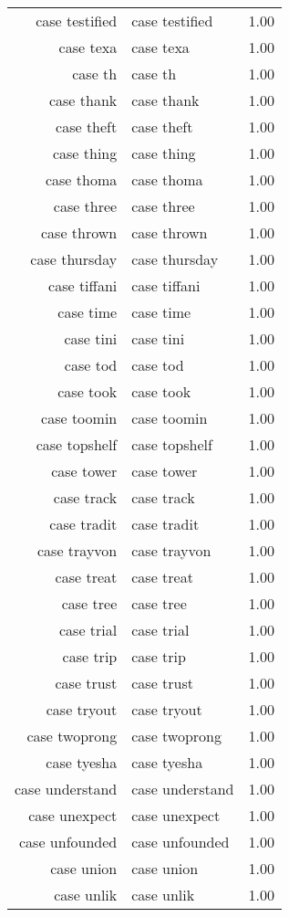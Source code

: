 \begin{table}[ht]
\begin{tabular}{rlr}
  case testified & case testified & 1.00 \\ 
  case texa & case texa & 1.00 \\ 
  case th & case th & 1.00 \\ 
  case thank & case thank & 1.00 \\ 
  case theft & case theft & 1.00 \\ 
  case thing & case thing & 1.00 \\ 
  case thoma & case thoma & 1.00 \\ 
  case three & case three & 1.00 \\ 
  case thrown & case thrown & 1.00 \\ 
  case thursday & case thursday & 1.00 \\ 
  case tiffani & case tiffani & 1.00 \\ 
  case time & case time & 1.00 \\ 
  case tini & case tini & 1.00 \\ 
  case tod & case tod & 1.00 \\ 
  case took & case took & 1.00 \\ 
  case toomin & case toomin & 1.00 \\ 
  case topshelf & case topshelf & 1.00 \\ 
  case tower & case tower & 1.00 \\ 
  case track & case track & 1.00 \\ 
  case tradit & case tradit & 1.00 \\ 
  case trayvon & case trayvon & 1.00 \\ 
  case treat & case treat & 1.00 \\ 
  case tree & case tree & 1.00 \\ 
  case trial & case trial & 1.00 \\ 
  case trip & case trip & 1.00 \\ 
  case trust & case trust & 1.00 \\ 
  case tryout & case tryout & 1.00 \\ 
  case twoprong & case twoprong & 1.00 \\ 
  case tyesha & case tyesha & 1.00 \\ 
  case understand & case understand & 1.00 \\ 
  case unexpect & case unexpect & 1.00 \\ 
  case unfounded & case unfounded & 1.00 \\ 
  case union & case union & 1.00 \\ 
  case unlik & case unlik & 1.00 \\ 

\end{tabular}
\end{table}
